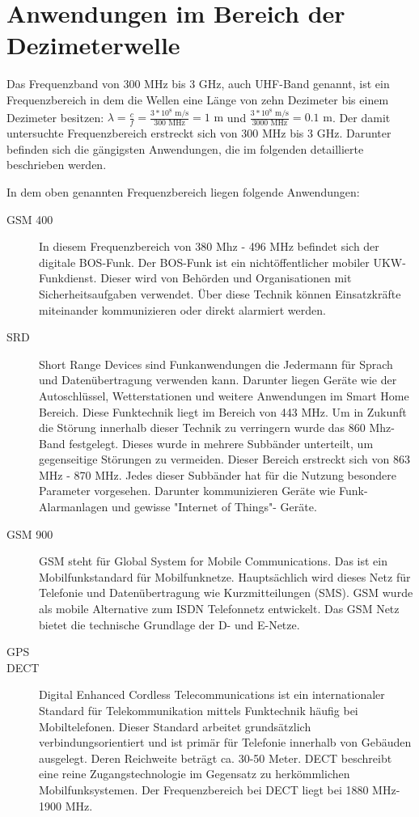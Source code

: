 \section{Anwendungen im Bereich der Dezimeterwelle}
Das Frequenzband von 300 MHz bis 3 GHz, auch \ac{UHF}-Band genannt, ist ein Frequenzbereich in dem die Wellen eine Länge von zehn Dezimeter bis einem Dezimeter besitzen:
\( \lambda = \frac{c}{f} = \frac{3*10^8 \text{ m/s}}{300 \text{ MHz}} = 1\text{ m}\)
und
\( \frac{3*10^8 \text{ m/s}}{3000 \text{ MHz}} = 0.1\text{ m}\).
Der damit untersuchte Frequenzbereich erstreckt sich von 300 MHz bis 3 GHz. Darunter befinden sich die gängigsten Anwendungen, die im folgenden detaillierte beschrieben werden.

In dem oben genannten Frequenzbereich liegen folgende Anwendungen:

\begin{description}
	\item [GSM 400]{In diesem Frequenzbereich von 380 Mhz - 496 MHz befindet sich der digitale \ac{BOS}-Funk. Der BOS-Funk ist ein nichtöffentlicher mobiler \ac{UKW}-Funkdienst. Dieser wird von Behörden und Organisationen mit Sicherheitsaufgaben verwendet. Über diese Technik können Einsatzkräfte miteinander kommunizieren oder direkt alarmiert werden.}
	\item [\ac{SRD}] {Short Range Devices sind Funkanwendungen die Jedermann für Sprach und Datenübertragung verwenden kann. Darunter liegen Geräte wie der Autoschlüssel, Wetterstationen und weitere Anwendungen im Smart Home Bereich. Diese Funktechnik liegt im Bereich von 443 MHz. Um in Zukunft die Störung innerhalb dieser Technik zu verringern  wurde das 860 Mhz-Band festgelegt. Dieses wurde in mehrere Subbänder unterteilt, um gegenseitige Störungen zu vermeiden. Dieser Bereich erstreckt sich von 863 MHz - 870 MHz. Jedes dieser Subbänder hat für die Nutzung besondere Parameter vorgesehen. Darunter kommunizieren Geräte wie Funk-Alarmanlagen und gewisse "Internet of Things"- Geräte.}
	\item [\ac{GSM} 900] {GSM steht für Global System for Mobile Communications. Das ist ein Mobilfunkstandard für Mobilfunknetze. Hauptsächlich wird dieses Netz für Telefonie und Datenübertragung wie Kurzmitteilungen (SMS). GSM wurde als mobile Alternative zum ISDN Telefonnetz entwickelt. Das GSM Netz bietet die technische Grundlage der D- und E-Netze.  }
	\item [GPS] {}%
	\item [DECT] {Digital Enhanced Cordless Telecommunications ist ein internationaler Standard für Telekommunikation mittels Funktechnik häufig bei Mobiltelefonen. Dieser Standard arbeitet grundsätzlich verbindungsorientiert und ist primär für Telefonie innerhalb von Gebäuden ausgelegt. Deren Reichweite beträgt ca. 30-50 Meter. DECT beschreibt eine reine Zugangstechnologie im Gegensatz zu herkömmlichen Mobilfunksystemen. Der Frequenzbereich bei DECT liegt bei 1880 MHz-1900 MHz.}

\end{description}
